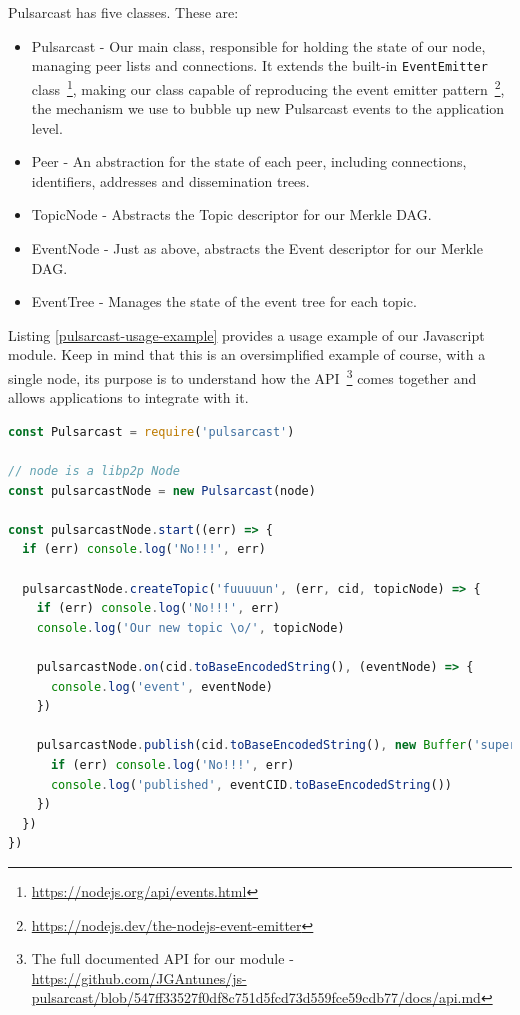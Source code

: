 Pulsarcast has five classes. These are:

\begin{itemize}
  \item
    Pulsarcast - Our main class, responsible for holding the state of our node, managing peer lists and connections. It extends the built-in \verb|EventEmitter| class~\footnote{\url{https://nodejs.org/api/events.html}}, making our class capable of reproducing the event emitter pattern~\footnote{\url{https://nodejs.dev/the-nodejs-event-emitter}}, the mechanism we use to bubble up new Pulsarcast events to the application level.
  \item
		Peer - An abstraction for the state of each peer, including connections, identifiers, addresses and dissemination trees.
  \item
    TopicNode - Abstracts the Topic descriptor for our Merkle DAG.
  \item
    EventNode - Just as above, abstracts the Event descriptor for our Merkle DAG.
  \item
    EventTree - Manages the state of the event tree for each topic.
\end{itemize}

Listing \ref{pulsarcast-usage-example} provides a usage example of our
Javascript module. Keep in mind that this is an oversimplified example of
course, with a single node, its purpose is to understand how the
API~\footnote{The full documented API for our module - \url{https://github.com/JGAntunes/js-pulsarcast/blob/547ff33527f0df8c751d5fcd73d559fce59cdb77/docs/api.md}}
comes together and allows applications to integrate with it.

\begin{lstlisting}[language=JavaScript, float=h, caption={Usage example of our Pulsarcast module},label={pulsarcast-usage-example}]
const Pulsarcast = require('pulsarcast')

// node is a libp2p Node
const pulsarcastNode = new Pulsarcast(node)

const pulsarcastNode.start((err) => {
  if (err) console.log('No!!!', err)
  
  pulsarcastNode.createTopic('fuuuuun', (err, cid, topicNode) => {
    if (err) console.log('No!!!', err)
    console.log('Our new topic \o/', topicNode)
    
    pulsarcastNode.on(cid.toBaseEncodedString(), (eventNode) => {
      console.log('event', eventNode)
    })
    
    pulsarcastNode.publish(cid.toBaseEncodedString(), new Buffer('super fun!'), (err, eventCID) => {
      if (err) console.log('No!!!', err)
      console.log('published', eventCID.toBaseEncodedString())
    })
  })
})
\end{lstlisting}

